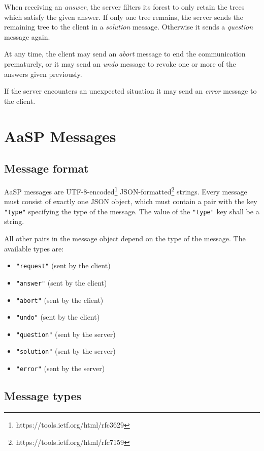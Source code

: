 \documentclass{scrartcl}
\newcommand{\messtype}[1]{\emph{#1}}
\newcommand{\jsstring}[1]{\texttt{\color{OrangeRed}"#1"}}
\begin{document}
When receiving an \messtype{answer}, the server filters its forest to only retain the trees which satisfy the given answer.
If only one tree remains, the server sends the remaining tree to the client in a \messtype{solution} message.
Otherwise it sends a \messtype{question} message again.

At any time, the client may send an \messtype{abort} message to end the communication prematurely, or it may send an \messtype{undo} message to revoke one or more of the answers given previously.

If the server encounters an unexpected situation it may send an \messtype{error} message to the client.

\section{AaSP Messages}
\label{sec:AaSP Messages}

\subsection{Message format}
\label{sub:Message format}

AaSP messages are UTF-8-encoded\footnote{https://tools.ietf.org/html/rfc3629}
JSON-formatted\footnote{https://tools.ietf.org/html/rfc7159}
strings.
Every message must consist of exactly one JSON object, which must contain a pair with the key \jsstring{type} specifying the type of the message.
The value of the \jsstring{type} key shall be a string.

All other pairs in the message object depend on the type of the message.
The available types are:

\begin{itemize}
    \item \jsstring{request} (sent by the client)
    \item \jsstring{answer} (sent by the client)
    \item \jsstring{abort} (sent by the client)
    \item \jsstring{undo} (sent by the client)
    \item \jsstring{question} (sent by the server)
    \item \jsstring{solution} (sent by the server)
    \item \jsstring{error} (sent by the server)
\end{itemize}

\subsection{Message types}
\label{sub:Message types}
\end{document}
